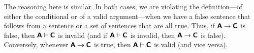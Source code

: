 The reasoning here is similar. In both cases, we are violating the definition---of either the conditional or of a valid argument---when we have a false sentence that follows from a sentence or a set of sentences that are all true. Thus, if $\bm{\mathsf{A}} \rightarrow \bm{\mathsf{C}}$ is false, then $\bm{\mathsf{A}} \vdash \bm{\mathsf{C}}$ is invalid (and if $\bm{\mathsf{A}} \vdash \bm{\mathsf{C}}$ is invalid, then $\bm{\mathsf{A}} \rightarrow \bm{\mathsf{C}}$ is false). Conversely, whenever $\bm{\mathsf{A}} \rightarrow \bm{\mathsf{C}}$ is true, then $\bm{\mathsf{A}} \vdash \bm{\mathsf{C}}$ is valid (and vice versa). 

